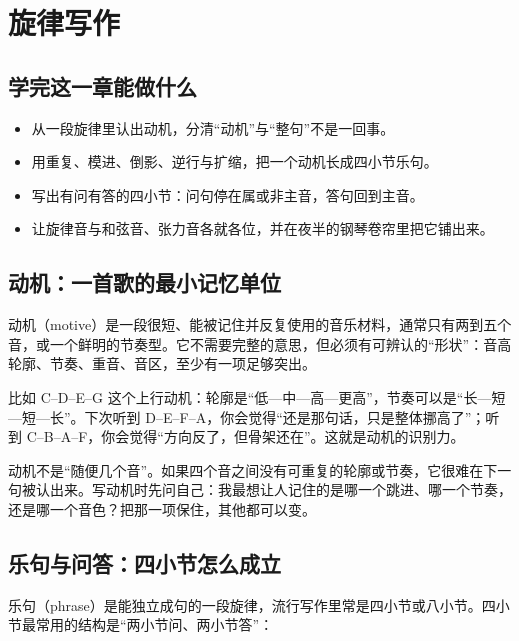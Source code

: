 \clearpage
\chapter{旋律写作}


\label{sec:melody-writing}

\section*{学完这一章能做什么}
\begin{itemize}
  \item 从一段旋律里认出动机，分清“动机”与“整句”不是一回事。
  \item 用重复、模进、倒影、逆行与扩缩，把一个动机长成四小节乐句。
  \item 写出有问有答的四小节：问句停在属或非主音，答句回到主音。
  \item 让旋律音与和弦音、张力音各就各位，并在夜半的钢琴卷帘里把它铺出来。
\end{itemize}

\section{动机：一首歌的最小记忆单位}

动机（motive）是一段很短、能被记住并反复使用的音乐材料，通常只有两到五个音，或一个鲜明的节奏型。它不需要完整的意思，但必须有可辨认的“形状”：音高轮廓、节奏、重音、音区，至少有一项足够突出。

比如 C–D–E–G 这个上行动机：轮廓是“低—中—高—更高”，节奏可以是“长—短—短—长”。下次听到 D–E–F–A，你会觉得“还是那句话，只是整体挪高了”；听到 C–B–A–F，你会觉得“方向反了，但骨架还在”。这就是动机的识别力。

动机不是“随便几个音”。如果四个音之间没有可重复的轮廓或节奏，它很难在下一句被认出来。写动机时先问自己：我最想让人记住的是哪一个跳进、哪一个节奏，还是哪一个音色？把那一项保住，其他都可以变。

\section{乐句与问答：四小节怎么成立}

乐句（phrase）是能独立成句的一段旋律，流行写作里常是四小节或八小节。四小节最常用的结构是“两小节问、两小节答”：

